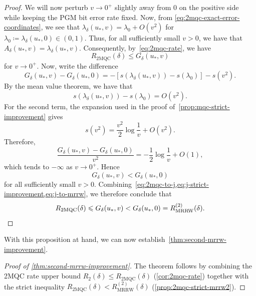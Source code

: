 \documentclass[11pt]{article}
\renewcommand{\leq}{\leqslant}
\theoremstyle{remark}
\newcommand{\MRRW}{R_{\mathrm{MRRW}}}
\newcommand{\mMQC}{2\mathrm{MQC}}
\begin{document}
\begin{proof}
We will now perturb $v \to 0^+$ slightly away from $0$ on the positive side while keeping the PGM bit error rate fixed. Now, from \cref{eq:2mqc-exact-error-coordinates}, we see that $\lambda_\delta(u_*,v) = \lambda_0+O(v^2)$ for $\lambda_0 \coloneqq \lambda_\delta(u_*,0) \in (0,1)$. Thus, for all sufficiently small $v > 0$, we have that $A_\delta(u_*,v) = \lambda_\delta(u_*,v)$. Consequently, by~\cref{eq:2mqc-rate}, we have 
\begin{equation}
\label{eq:2mqc-to-j}
R_{\mMQC}(\delta) \leq G_\delta(u_*,v)
\end{equation}
for $v \to 0^+$. Now, write the difference
\begin{equation*}
G_\delta(u_*,v)-G_\delta(u_*,0)
= -\left[s\left(\lambda_\delta(u_*,v)\right)-s(\lambda_0)\right]-s(v^2).
\end{equation*}
By the mean value theorem, we have that
\begin{equation*}
s\left(\lambda_\delta(u_*,v)\right)-s(\lambda_0) = O(v^2).
\end{equation*}
For the second term, the expansion used in the proof of~\cref{prop:mqc-strict-improvement} gives
\begin{equation*}
s(v^2) = \frac{v^2}{2}\log{\frac{1}{v}}+O(v^2).
\end{equation*}
Therefore,
\begin{equation*}
\frac{G_\delta(u_*,v)-G_\delta(u_*,0)}{v^2}
= -\frac{1}{2}\log{\frac{1}{v}}+O(1),
\end{equation*}
which tends to $-\infty$ as $v \to 0^+$. Hence 
\begin{equation}
\label{eq:j-strict-improvement}
G_\delta(u_*,v) < G_\delta(u_*,0)
\end{equation}
for all sufficiently small $v > 0$. Combining~\cref{eq:2mqc-to-j,eq:j-strict-improvement,eq:j-to-mrrw}, we therefore conclude that
\begin{equation*}
R_{\mMQC}(\delta)
\leq G_\delta(u_*,v)
< G_\delta(u_*,0)
= \MRRW^{(2)}(\delta).\qedhere
\end{equation*}
\end{proof}

With this proposition at hand, we can now establish~\cref{thm:second-mrrw-improvement}.

\begin{proof}[Proof of \cref{thm:second-mrrw-improvement}]
The theorem follows by combining the 2MQC rate upper bound $R_2(\delta) \leq R_{\mMQC}(\delta)$ (\cref{cor:2mqc-rate}) together with the strict inequality $R_{\mMQC}(\delta) < \MRRW^{(2)}(\delta)$ (\cref{prop:2mqc-strict-mrrw2}).\qedhere
\end{proof}
\end{document}
